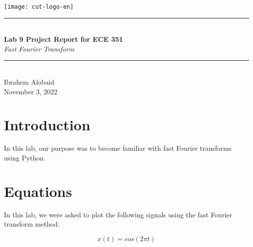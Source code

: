 \documentclass[12pt,a4paper]{article}
\newcommand{\HRule}{\rule{\linewidth}{0.5mm}}
\begin{document}
\begin{titlepage}
\begin{center}
\texttt{[image: cut-logo-en]}~\\[2cm]
\HRule \\[0.4cm]
{ \LARGE 
  \textbf{Lab 9 Project Report for ECE 351}\\[0.4cm]
  \emph{Fast Fourier Transform}\\[0.4cm]
}
\HRule \\[1.5cm]
{ \large
  Ibrahem Alobaid \\[0.1cm]
  November 3, 2022\\[0.1cm]
}
\vfill

\end{center}
\end{titlepage}
\newpage
\tableofcontents
{}
\newpage
\setcounter{page}{1}
\section{Introduction}\label{sec:intro}
    In this lab, our purpose was to become familiar with fast Fourier transforms using Python.

\section{Equations}\label{sec:lit-rev}

In this lab, we were asked to plot the following signals using the fast Fourier transform method:

\begin{equation}
    x(t) = cos(2\pi t)
\end{equation}
\end{document}
